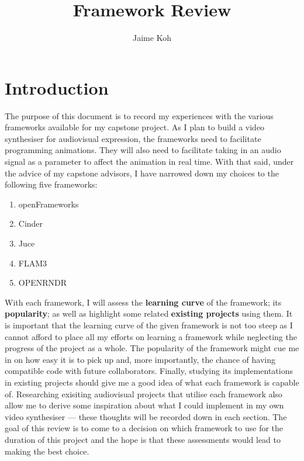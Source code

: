 \documentclass{article}
\title{Framework Review}
\author{Jaime Koh}
\begin{document}
\maketitle

\section{Introduction}
The purpose of this document is to record my experiences with the various frameworks available for my capstone project. As I plan to build a video synthesiser for audiovisual expression, the frameworks need to facilitate programming animations. They will also need to facilitate taking in an audio signal as a parameter to affect the animation in real time. With that said, under the advice of my capstone advisors, I have narrowed down my choices to the following five frameworks:

\begin{enumerate}
\item openFrameworks
\item Cinder
\item Juce
\item FLAM3
\item OPENRNDR
\end{enumerate}

With each framework, I will assess the \textbf{learning curve} of the framework; its \textbf{popularity}; as well as highlight some related \textbf{existing projects} using them. It is important that the learning curve of the given framework is not too steep as I cannot afford to place all my efforts on learning a framework while neglecting the progress of the project as a whole. The popularity of the framework might cue me in on how easy it is to pick up and, more importantly, the chance of having compatible code with future collaborators. Finally, studying its implementations in existing projects should give me a good idea of what each framework is capable of. Researching exisiting audiovisual projects that utilise each framework also allow me to derive some inspiration about what I could implement in my own video synthesiser --- these thoughts will be recorded down in each section. The goal of this review is to come to a decision on which framework to use for the duration of this project and the hope is that these assessments would lead to making the best choice.






\end{document}
